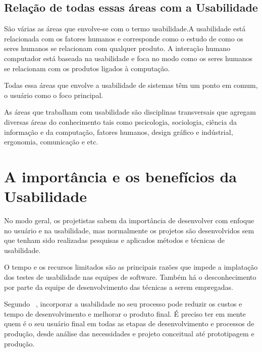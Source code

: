 

\subsection{Relação de todas essas áreas com a Usabilidade}

	São várias as áreas que envolve-se com o termo usabilidade.A usabilidade está relacionada com os fatores humanos e corresponde como o estudo de como os seres humanos se relacionam com qualquer produto. A interação humano computador está baseada na usabilidade e foca no modo como os seres humanos se relacionam com os produtos ligados à computação.

	Todas essa áreas que envolve a usabilidade de sistemas têm um ponto em comum, o usuário como o foco principal.

	As áreas que trabalham com usabilidade são disciplinas transversais que agregam diversas áreas do conhecimento tais como pscicologia, sociologia, ciência da informação e da computação, fatores humanos, design gráfico e indústrial, ergonomia, comunicação e etc.

	 

\section{A importância e os benefícios da Usabilidade}

No modo geral, os projetistas sabem da importância de desenvolver com enfoque no usuário e na usabilidade, mas normalmente os projetos são desenvolvidos sem que tenham sido realizadas pesquisas e aplicados métodos e técnicas de usabilidade.
	
	O tempo e os recursos limitados são as principais razões que impede a implatação dos testes de usabilidade nas equipes de software. Também há o desconhecimento por parte da equipe de desenvolvimento das técnicas a serem empregadas.

	Segundo ~, incorporar a usabilidade no seu processo pode reduzir os custos e tempo de desenvolvimento e melhorar o produto final. É preciso ter em mente quem é o seu usuário final em todas as etapas de desenvolvimento e processos de produção, desde análise das necessidades e projeto conceitual até prototipagem e produção. 

